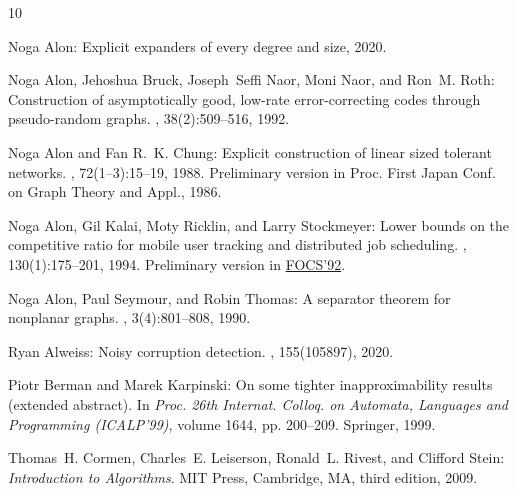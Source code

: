\documentclass[11pt]{article}
\numberwithin{equation}{section}
\theoremstyle{definition}
\theoremstyle{plain}
\begin{document}
\tocrefpdfbookmark
\begin{thebibliography}{10}

{\sc Noga Alon}: Explicit expanders of every degree and size, 2020.

{\sc Noga Alon, Jehoshua Bruck, Joseph~Seffi Naor, Moni Naor, and Ron~M. Roth}:
  Construction of asymptotically good, low-rate error-correcting codes through
  pseudo-random graphs.
, 38(2):509--516, 1992.
\newblock [\epfmtdoi{10.1109/18.119713}]

{\sc Noga Alon and Fan R.~K. Chung}: Explicit construction of linear sized
  tolerant networks.
, 72(1--3):15--19, 1988.
\newblock Preliminary version in Proc. First Japan Conf. on Graph Theory and
  Appl., 1986.
\newblock [\epfmtdoi{10.1016/0012-365X(88)90189-6}]

{\sc Noga Alon, Gil Kalai, Moty Ricklin, and Larry Stockmeyer}: Lower bounds on
  the competitive ratio for mobile user tracking and distributed job
  scheduling.
, 130(1):175--201, 1994.
\newblock Preliminary version in
  \href{https://doi.org/10.1109/SFCS.1992.267757}{FOCS'92}.
\newblock [\epfmtdoi{10.1016/0304-3975(94)90158-9}]

{\sc Noga Alon, Paul Seymour, and Robin Thomas}: A separator theorem for
  nonplanar graphs.
, 3(4):801--808, 1990.
\newblock [\epfmtdoi{10.2307/1990903}]

{\sc Ryan Alweiss}: Noisy corruption detection.
, 155(105897), 2020.

{\sc Piotr Berman and Marek Karpinski}: On some tighter inapproximability
  results (extended abstract).
\newblock In {\em Proc. 26th Internat. Colloq. on Automata, Languages and
  Programming (ICALP'99)}, volume 1644, pp. 200--209. Springer, 1999.
\newblock [\epfmtdoi{10.1007/3-540-48523-6\_17}]

{\sc Thomas~H. Cormen, Charles~E. Leiserson, Ronald~L. Rivest, and Clifford
  Stein}: {\em Introduction to Algorithms}.
\newblock MIT Press, Cambridge, MA, third edition, 2009.


\end{thebibliography}
\end{document}
